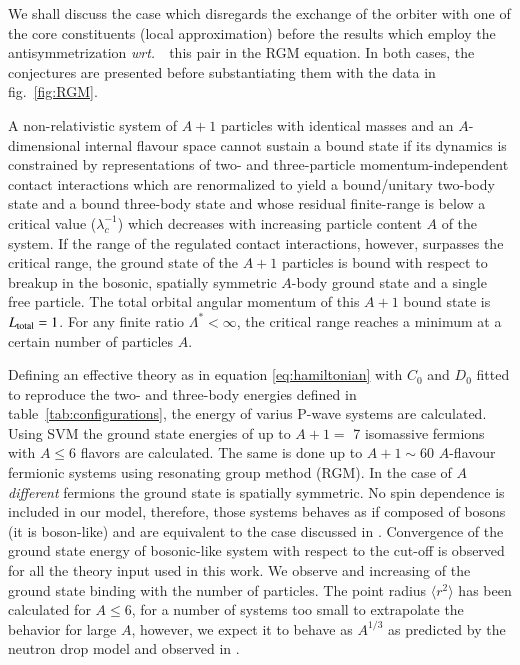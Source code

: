 \documentclass[preprint,12pt]{elsarticle}
\newcommand{\wrt}{\textit{wrt.}~}
\newcommand{\figref}[1]{fig.~\ref{#1}}
\newcommand{\tabref}[1]{table~\ref{#1}}
\begin{document}
We shall discuss the case which disregards the exchange of the orbiter with one of the core constituents (local
approximation) before the results which employ the antisymmetrization \wrt~this pair in the RGM equation.
In both cases, the conjectures are presented before substantiating them with the data in \figref{fig:RGM}.

A non-relativistic system of $A+1$ particles with identical masses and
an $A$-dimensional internal flavour space cannot sustain a bound state if
its dynamics is constrained by representations of two- and three-particle
momentum-independent contact interactions which are renormalized to yield
a bound/unitary two-body state and a bound three-body state and whose
residual finite-range is below a critical value ($\lambda_c^{−1}$)
which decreases with increasing particle content $A$ of the system.
If the range of the regulated contact interactions, however, surpasses the
critical range, the ground state of the $A+1$ particles is bound with respect
to breakup in the bosonic, spatially symmetric $A$-body ground state and a
single free particle. The total orbital angular momentum of this $A+1$ bound
state is $L_{\text{\scriptsize total}}= 1$.
For any finite ratio $\Lambda^*<\infty$,
the critical range reaches a minimum at a certain number of particles $A$.


\newpage
Defining an effective theory as in equation \ref{eq:hamiltonian} with $C_0$ and $D_0$ fitted to reproduce the two- and 
three-body energies defined in \tabref{tab:configurations}, the energy of varius P-wave systems are calculated.
Using SVM the ground state energies of up to $A+1=$ 7 isomassive fermions with $A \le $6 flavors are calculated.
The same is done up to $A+1\sim$60 $A$-flavour fermionic systems using resonating group method (RGM).
In the case of $A$ \textit{different} fermions the ground state is spatially symmetric.
No spin dependence is included in our model, therefore, those systems behaves as if composed of bosons (it is boson-like) 
and are equivalent to the case discussed in \cite{manybosons}.
Convergence of the ground state energy of bosonic-like system with respect to the cut-off is observed for all the theory 
input used in this work.
We observe and increasing of the ground state binding with the number of particles. 
The point radius $\langle r^2 \rangle$ has been calculated for $A\le6$, for a number of systems too small to extrapolate the 
behavior for large $A$, however, we expect it to behave as $A^{1/3}$ as predicted by the neutron drop model and observed in  
\cite{manybosons}.
\end{document}
